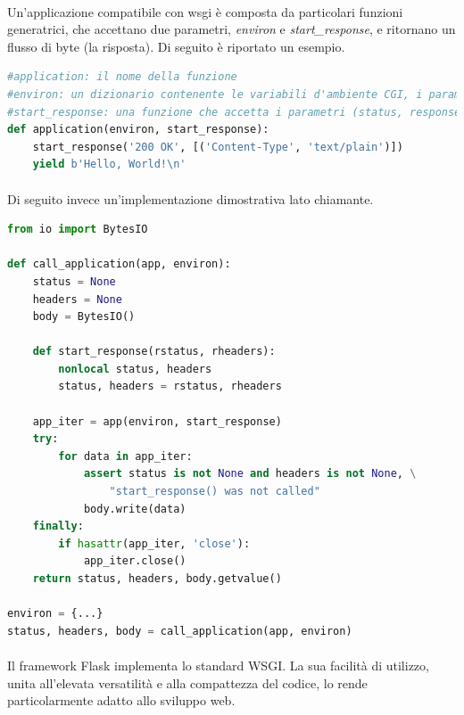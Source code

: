 \documentclass[11pt,a4paper,english]{article}
\begin{document}
\paragraph{} Un'applicazione compatibile con wsgi è composta da particolari funzioni generatrici, che accettano due parametri, \emph{environ} e \emph{start\_response}, e ritornano un flusso di byte (la risposta). Di seguito è riportato un esempio.

\begin{lstlisting}[language=python, caption=Applicazione hello world]
#application: il nome della funzione
#environ: un dizionario contenente le variabili d'ambiente CGI, i parametri della richiesta e altri parametri user-defined
#start_response: una funzione che accetta i parametri (status, response_headers)
def application(environ, start_response):
    start_response('200 OK', [('Content-Type', 'text/plain')])
    yield b'Hello, World!\n'
\end{lstlisting}

\paragraph{} Di seguito invece un'implementazione dimostrativa lato chiamante. 

\begin{lstlisting}[language=python, caption=Implementazione dimostrativa chiamante]
from io import BytesIO

def call_application(app, environ):
    status = None
    headers = None
    body = BytesIO()
    
    def start_response(rstatus, rheaders):
        nonlocal status, headers
        status, headers = rstatus, rheaders
        
    app_iter = app(environ, start_response)
    try:
        for data in app_iter:
            assert status is not None and headers is not None, \
                "start_response() was not called"
            body.write(data)
    finally:
        if hasattr(app_iter, 'close'):
            app_iter.close()
    return status, headers, body.getvalue()

environ = {...} 
status, headers, body = call_application(app, environ)
\end{lstlisting}

\paragraph{} Il framework Flask implementa lo standard WSGI. La sua facilità di utilizzo, unita all'elevata versatilità e alla compattezza del codice, lo rende particolarmente adatto allo sviluppo web.
\end{document}
